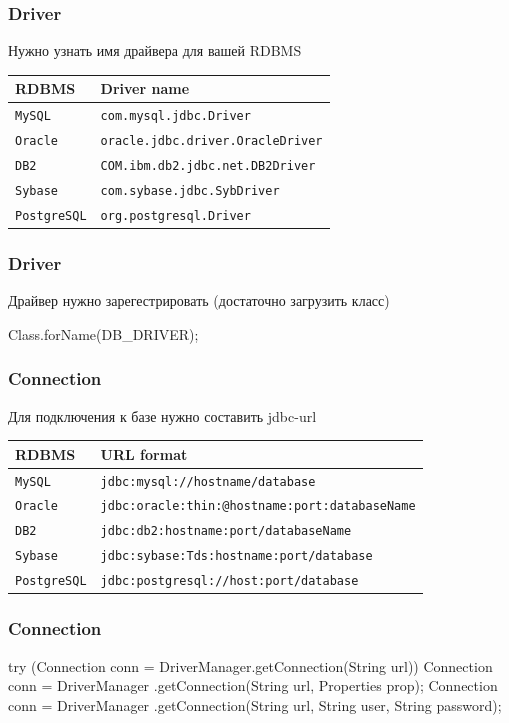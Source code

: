 \documentclass[russian,aspectratio=169,14pt]{beamer}
\begin{document}
\begin{frame}
	\frametitle{Driver}
	Нужно узнать имя драйвера для вашей RDBMS
	\vfill
	\begin{center}
	\begin{tabular}{l|l}
		\small
		RDBMS & Driver name \\
		\hline
		\hline
		\texttt{MySQL} & \texttt{com.mysql.jdbc.Driver} \\
		\hline
		\texttt{Oracle} & \texttt{oracle.jdbc.driver.OracleDriver} \\
		\hline
		\texttt{DB2} & \texttt{COM.ibm.db2.jdbc.net.DB2Driver} \\
		\hline
		\texttt{Sybase} & \texttt{com.sybase.jdbc.SybDriver} \\
		\hline
		\texttt{PostgreSQL} & \texttt{org.postgresql.Driver} \\
		\hline
	\end{tabular}
	\end{center}
\end{frame}

\begin{frame}[fragile]
	\frametitle{Driver}
	Драйвер нужно зарегестрировать (достаточно загрузить класс)
	\begin{listjava}
Class.forName(DB_DRIVER);
	\end{listjava}
\end{frame}

\begin{frame}
	\frametitle{Connection}
	Для подключения к базе нужно составить jdbc-url
	\vfill
	\begin{center}
	\begin{tabular}{l|l}
		\small
		RDBMS & URL format \\
		\hline
		\hline
		\texttt{MySQL} & \texttt{jdbc:mysql://hostname/database} \\
		\hline
		\texttt{Oracle} & \texttt{jdbc:oracle:thin:@hostname:port:databaseName}	\\
		\hline
		\texttt{DB2} & \texttt{jdbc:db2:hostname:port/databaseName} \\
		\hline
		\texttt{Sybase} & \texttt{jdbc:sybase:Tds:hostname:port/database} \\
		\hline
		\texttt{PostgreSQL} & \texttt{jdbc:postgresql://host:port/database} \\
		\hline
	\end{tabular}
	\end{center}
\end{frame}

\begin{frame}[fragile]
	\frametitle{Connection}
	\begin{listjava}
try (Connection conn = DriverManager.getConnection(String url)) {}
Connection conn = DriverManager
        .getConnection(String url, Properties prop);
Connection conn = DriverManager
        .getConnection(String url, String user, String password);
	\end{listjava}
\end{frame}
\end{document}
